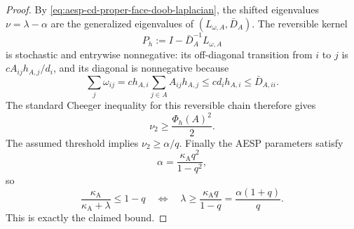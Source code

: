 \begin{proof}
By \cref{eq:aesp-cd-proper-face-doob-laplacian}, the shifted eigenvalues
\(\nu=\lambda-\alpha\) are the generalized eigenvalues of
\((L_{\omega,A},\bar D_A)\).  The reversible kernel
\begin{equation*}
 P_h:=I-\bar D_A^{-1}L_{\omega,A}
\end{equation*}
is stochastic and entrywise nonnegative: its off-diagonal transition from
\(i\) to \(j\) is \(cA_{ij}h_{A,j}/d_i\), and its diagonal is nonnegative
because
\begin{equation*}
 \sum_j\omega_{ij}
 =c h_{A,i}\sum_{j\in A}A_{ij}h_{A,j}
 \leq c d_i h_{A,i}
 \leq\bar D_{A,ii}.
\end{equation*}
The standard Cheeger inequality for this reversible chain therefore gives
\begin{equation*}
 \nu_2\geq\frac{\Phi_h(A)^2}{2}.
\end{equation*}
The assumed threshold implies \(\nu_2\geq\alpha/q\).
Finally the AESP parameters satisfy
\begin{equation*}
 \alpha=\frac{\kappa_{\mathrm A}q^2}{1-q^2},
\end{equation*}
so
\begin{equation*}
 \frac{\kappa_{\mathrm A}}{\kappa_{\mathrm A}+\lambda}\leq1-q
 \quad\Longleftrightarrow\quad
 \lambda\geq\frac{\kappa_{\mathrm A}q}{1-q}
 =\frac{\alpha(1+q)}q.
\end{equation*}
This is exactly the claimed bound.
\end{proof}

